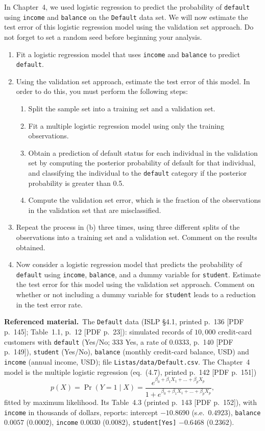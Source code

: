 \documentclass[11pt,a4paper]{article}
\numberwithin{equation}{questao}   %
\newenvironment{refmat}{\par\smallskip\noindent\begin{small}\textbf{Referenced material.}\ }{\end{small}\par\smallskip}
\begin{document}
In Chapter~4, we used logistic regression to predict the probability of \texttt{default} using
\texttt{income} and \texttt{balance} on the \texttt{Default} data set. We will now estimate the test
error of this logistic regression model using the validation set approach. Do not forget to set
a random seed before beginning your analysis.
\begin{enumerate}[label=(\alph*)]
\item Fit a logistic regression model that uses \texttt{income} and \texttt{balance} to predict \texttt{default}.
\item Using the validation set approach, estimate the test error of this model. In order to do
this, you must perform the following steps:
  \begin{enumerate}[label=\roman*.]
  \item Split the sample set into a training set and a validation set.
  \item Fit a multiple logistic regression model using only the training observations.
  \item Obtain a prediction of default status for each individual in the validation set by
  computing the posterior probability of default for that individual, and classifying the
  individual to the \texttt{default} category if the posterior probability is greater than 0.5.
  \item Compute the validation set error, which is the fraction of the observations in the
  validation set that are misclassified.
  \end{enumerate}
\item Repeat the process in (b) three times, using three different splits of the observations
into a training set and a validation set. Comment on the results obtained.
\item Now consider a logistic regression model that predicts the probability of \texttt{default}
using \texttt{income}, \texttt{balance}, and a dummy variable for \texttt{student}. Estimate the test
error for this model using the validation set approach. Comment on whether or not including a
dummy variable for \texttt{student} leads to a reduction in the test error rate.
\end{enumerate}
\begin{refmat}The \texttt{Default} data (ISLP §4.1, printed p.~136 [PDF p.~145]; Table~1.1, p.~12
[PDF p.~23]): simulated records of $10{,}000$ credit-card customers with \texttt{default} (Yes/No; 333
Yes, a rate of $0.0333$, p.~140 [PDF p.~149]), \texttt{student} (Yes/No), \texttt{balance} (monthly
credit-card balance, USD) and \texttt{income} (annual income, USD); file \texttt{Listas/data/Default.csv}.
The Chapter~4 model is the multiple logistic regression (eq.~(4.7), printed p.~142 [PDF p.~151])
\[p(X)=\Pr(Y=1\mid X)=\frac{e^{\beta_0+\beta_1X_1+\dots+\beta_pX_p}}{1+e^{\beta_0+\beta_1X_1+\dots+\beta_pX_p}},\]
fitted by maximum likelihood. Its Table~4.3 (printed p.~143 [PDF p.~152]), with \texttt{income} in
thousands of dollars, reports: intercept $-10.8690$ (s.e.\ $0.4923$), \texttt{balance} $0.0057$
($0.0002$), \texttt{income} $0.0030$ ($0.0082$), \texttt{student[Yes]} $-0.6468$ ($0.2362$).\end{refmat}
\end{document}
